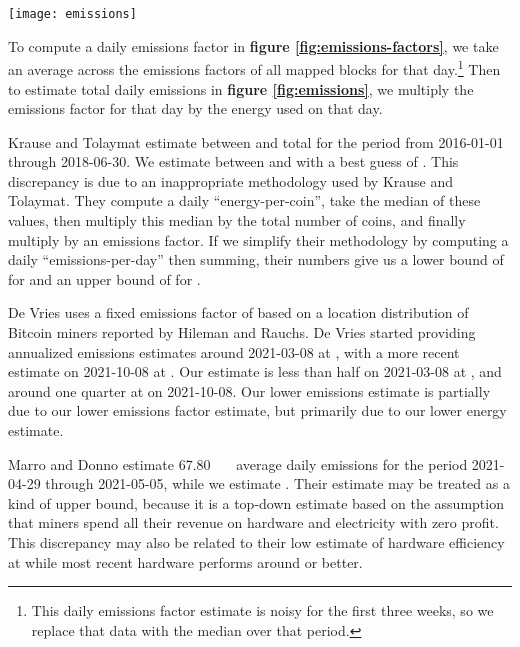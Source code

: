 \begin{figure*}[htp]
    \centering
    \texttt{[image: emissions]}
    \caption{Ethereum emissions in \SI{}{\kilo\ton\COtwo\per{day}} and equivalent annualized \SI{}{\mega\ton\COtwo\per{year}} based on energy usage, block metadata, and regional emissions factors. Shaded region shows the range between our lower and upper estimates.}
    \label{fig:emissions}
\end{figure*}

To compute a daily emissions factor in \textbf{figure \ref{fig:emissions-factors}}, we take an average across the emissions factors of all mapped blocks for that day.\footnote{This daily emissions factor estimate is noisy for the first three weeks, so we replace that data with the median over that period.} Then to estimate total daily emissions in \textbf{figure \ref{fig:emissions}}, we multiply the emissions factor for that day by the energy used on that day.

Krause and Tolaymat estimate between  and  total for the period from 2016-01-01 through 2018-06-30. We estimate between  and  with a best guess of . This discrepancy is due to an inappropriate methodology used by Krause and Tolaymat. They compute a daily ``energy-per-coin'', take the median of these values, then multiply this median by the total number of coins, and finally multiply by an emissions factor. If we simplify their methodology by computing a daily ``emissions-per-day'' then summing, their numbers give us a lower bound of  for  and an upper bound of  for .

De Vries uses a fixed emissions factor of  based on a location distribution of Bitcoin miners reported by Hileman and Rauchs\cite{hileman_2017_2017}. De Vries started providing annualized emissions estimates around 2021-03-08 at , with a more recent estimate on 2021-10-08 at . Our estimate is less than half on 2021-03-08 at , and around one quarter at  on 2021-10-08. Our lower emissions estimate is partially due to our lower emissions factor estimate, but primarily due to our lower energy estimate.

Marro and Donno estimate \SI{67.80}{\kilo\ton\COtwoe} average daily emissions for the period 2021-04-29 through 2021-05-05, while we estimate . Their estimate may be treated as a kind of upper bound, because it is a top-down estimate based on the assumption that miners spend all their revenue on hardware and electricity with zero profit. This discrepancy may also be related to their low estimate of hardware efficiency at  while most recent hardware performs around  or better.

